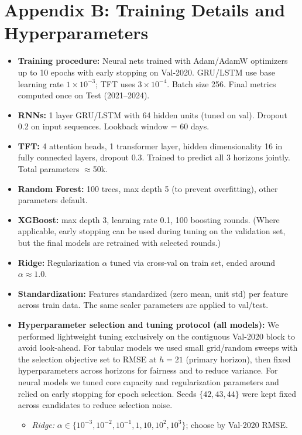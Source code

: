 \documentclass[10pt,twocolumn]{article}
\begin{document}
\section*{Appendix B: Training Details and Hyperparameters}
\begin{small}
\begin{itemize}
    \item \textbf{Training procedure:} Neural nets trained with Adam/AdamW optimizers up to 10 epochs with early stopping on Val-2020. GRU/LSTM use base learning rate $1\times10^{-3}$; TFT uses $3\times10^{-4}$. Batch size 256. Final metrics computed once on Test (2021--2024).
    \item \textbf{RNNs:} 1 layer GRU/LSTM with 64 hidden units (tuned on val). Dropout 0.2 on input sequences. Lookback window = 60 days.
    \item \textbf{TFT:} 4 attention heads, 1 transformer layer, hidden dimensionality 16 in fully connected layers, dropout 0.3. Trained to predict all 3 horizons jointly. Total parameters $\approx$50k.
    \item \textbf{Random Forest:} 100 trees, max depth 5 (to prevent overfitting), other parameters default.
    \item \textbf{XGBoost:} max depth 3, learning rate 0.1, 100 boosting rounds. (Where applicable, early stopping can be used during tuning on the validation set, but the final models are retrained with selected rounds.)
    \item \textbf{Ridge:} Regularization $\alpha$ tuned via cross-val on train set, ended around $\alpha \approx 1.0$.
    \item \textbf{Standardization:} Features standardized (zero mean, unit std) per feature across train data. The same scaler parameters are applied to val/test.
        \item \textbf{Hyperparameter selection and tuning protocol (all models):} We performed lightweight tuning exclusively on the contiguous Val-2020 block to avoid look-ahead. For tabular models we used small grid/random sweeps with the selection objective set to RMSE at $h{=}21$ (primary horizon), then fixed hyperparameters across horizons for fairness and to reduce variance. For neural models we tuned core capacity and regularization parameters and relied on early stopping for epoch selection. Seeds $\{42,43,44\}$ were kept fixed across candidates to reduce selection noise.
        \begin{itemize}
            \item \emph{Ridge:} $\alpha\in\{10^{-3},10^{-2},10^{-1},1,10,10^{2},10^{3}\}$; choose by Val-2020 RMSE.

\end{itemize}
\end{itemize}
\end{small}
\end{document}
